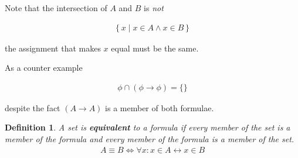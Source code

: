 \documentclass{article}
\newtheorem{defin}{Definition}
\begin{document}
Note that the intersection of $A$ and $B$ is \textit{not}

\begin{align*}
\left\{x \mid x \in A \land x \in B\right\}
\end{align*}

the assignment that makes $x$ equal must be the same.

As a counter example

\begin{align*}
\phi \cap (\phi \rightarrow \phi) = \{\}
\end{align*}

despite the fact $(A \rightarrow A)$ is a member of both formulae.

\begin{defin}
A set is \textbf{equivalent} to a formula if every member of the set is a member of the formula and every member of the formula is a member of the set.
\begin{align*}
A \equiv B \iff \forall x: x \in A \leftrightarrow x \in B
\end{align*}
\end{defin}
\end{document}
